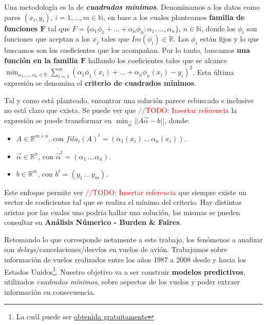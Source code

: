 \documentclass{endm}
\newcommand{\Nat}{{\mathbb N}}
\newcommand{\Real}{{\mathbb R}}
\begin{document}
Una metodolog\'ia es la de \textbf{\textit{cuadrados m\'inimos}}. Denominamos a los datos como pares $(x_i, y_i)$, $i = 1, ..., m \in \Nat$, en base a los cuales planteamos \textbf{familia de funciones $\mathbf{F}$} tal que $F = \{\alpha_1\phi_1 + ... + \alpha_n\phi_n : \alpha_1, ..., \alpha_n\}$, $n \in \Nat$, donde los $\phi_i$ son funciones que aceptan a los $x_j$ tales que $Im(\phi_i) \in \Real$. Los $\phi_i$ est\'an fijos y lo que buscamos son los coeficientes que los acompa\~nan. Por lo tanto, buscamos \textbf{una funci\'on en la familia $\mathbf{F}$} hallando los coeficientes tales que se alcance $\min_{\alpha_1, ..., \alpha_n \in \Real} \sum_{i = 1}^{m} (\alpha_1\phi_1(x_i) + ... + \alpha_n\phi_n(x_i) - y_i)^{2}$. Esta \'ultima expresi\'on se denomina el \textbf{criterio de cuadrados m\'inimos}.

Tal y como est\'a planteado, encontrar una soluci\'on parece rebuscado e inclusive no est\'a claro que exista. Se puede ver que \textcolor{red}{//TODO: Insertar referencia} la expresi\'on se puede transformar en $\min_{\vec{\alpha}}||A\vec{\alpha} - b||$, donde:

\begin{itemize}
\item $A \in \Real^{m \times n}$, con $fila_i(A)^{t} = (\alpha_1(x_i) \, ... \, \alpha_n(x_i))$.
\item $\vec{\alpha} \in \Real^{n}$, con $\vec{\alpha}^{t} = (\alpha_1 \, ... \, \alpha_n)$.
\item $b \in \Real^{m}$, con $b^{t} = (y_1 \, ... \, y_m)$.
\end{itemize}

Este enfoque permite ver \textcolor{red}{//TODO: Insertar referencia} que siempre existe un vector de coeficientes tal que se realiza el m\'inimo del criterio. Hay distintas aristas por las cuales uno podr\'ia hallar una soluci\'on, las mismas se pueden consultar en \textbf{An\'alisis N\'umerico - Burden \& Faires}.

Retomando lo que corresponde netamente a este trabajo, los fen\'omenos a analizar son \textit{delays}/cancelaciones/desv\'ios en vuelos de avi\'on. Trabajamos sobre informaci\'on de vuelos realizados entre los a\~nos 1987 a 2008 desde y hacia los Estados Unidos\footnote{La cu\'al puede ser \href{http://stat-computing.org/dataexpo/2009/the-data.html}{obtenida gratuitamente}}. Nuestro objetivo va a ser construir \textbf{modelos predictivos}, utilizados \textit{cuadrados m\'inimos}, sobre aspectos de los vuelos y poder extraer informaci\'on en consecuencia.
\end{document}
